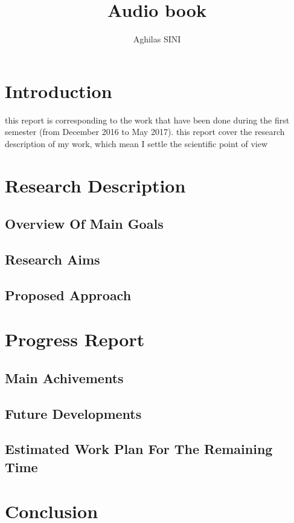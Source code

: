 \documentclass[10pt,a4paper]{article}
\author{Aghilas SINI}
\title{ Audio book  }
\begin{document}
\maketitle
\tableofcontents
\section{Introduction}
this report is corresponding to the work that have been done during the first semester (from December 2016 to May 2017). this report cover the research description  of my work, which mean I settle the scientific point of view 
\section{Research Description}
\subsection{Overview Of Main Goals}
\subsection{Research Aims}
\subsection{Proposed Approach}
\section{Progress Report}
\subsection{Main Achivements}
\subsection{Future Developments}
\subsection{Estimated Work Plan For The Remaining Time}
\section{Conclusion}
\end{document}
